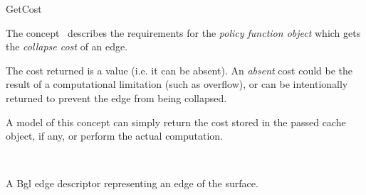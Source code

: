 
\begin{ccRefConcept}{GetCost}


\ccDefinition

The concept \ccRefName\ describes the requirements for the {\em policy function object} which gets the {\em collapse cost} of an edge.

The cost returned is a  value (i.e. it can be absent). An {\em absent} cost could be the result of a computational limitation (such as overflow), or can be intentionally returned to prevent the edge from being collapsed.

A model of this concept can simply return the cost stored in the
passed cache object, if any, or perform the actual computation.

\ccRefines
{}\\

\ccTypes
\ccGlue    
\ccGlue    
\ccGlue    
  {A {\sc Bgl} edge descriptor representing an edge of the surface.}
\ccGlue    

\ccCreation
{}  %



\end{ccRefConcept}
